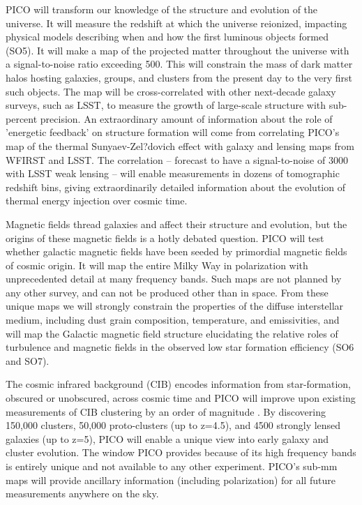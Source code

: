 \documentclass[PICOReport.tex]{subfiles}
\begin{document}
PICO will transform our knowledge of the structure and evolution of the universe. It will measure the redshift at which the universe reionized, impacting physical models describing when and how the first luminous objects formed (SO5).  It will make a map of the projected matter throughout the universe with a signal-to-noise ratio exceeding 500. This will constrain the mass of dark matter halos hosting galaxies, groups, and clusters from the present day to the very first such objects.  The map will be cross-correlated with other next-decade galaxy surveys, such as LSST, to measure the growth of large-scale structure with sub-percent precision.  An extraordinary amount of information about the role of 'energetic feedback' on structure formation will come from correlating PICO's map of the thermal Sunyaev-Zel?dovich effect with galaxy and lensing maps from WFIRST and LSST. The correlation -- forecast to have a signal-to-noise of 3000 with LSST weak lensing -- will enable measurements in dozens of tomographic redshift bins, giving extraordinarily detailed information about the evolution of thermal energy injection over cosmic time.

Magnetic fields thread galaxies and affect their structure and evolution, but the origins of these magnetic fields is a hotly debated question. PICO will test whether galactic magnetic fields have been seeded by primordial magnetic fields of cosmic origin. It will map the entire Milky Way in polarization with unprecedented detail at many frequency bands. Such maps are not planned by any other survey, and can not be produced other than in space.  From these unique maps we will strongly constrain the properties of the diffuse interstellar medium, including dust grain composition, temperature, and emissivities, and will map the Galactic magnetic field structure elucidating the relative roles of turbulence and magnetic fields in the observed low star formation efficiency (SO6 and SO7).

The cosmic infrared background (CIB) encodes information from star-formation, obscured or unobscured, across cosmic time and PICO will improve upon existing measurements of CIB clustering by an order of magnitude .  By discovering 150,000 clusters, 50,000 proto-clusters (up to z=4.5), and 4500 strongly lensed galaxies (up to z=5), PICO will enable a unique view into early galaxy and cluster evolution. The window PICO provides because of its high frequency bands is entirely unique and not available to any other experiment.  PICO's sub-mm maps will provide ancillary information (including polarization) for all future measurements anywhere on the sky.  
\end{document}
